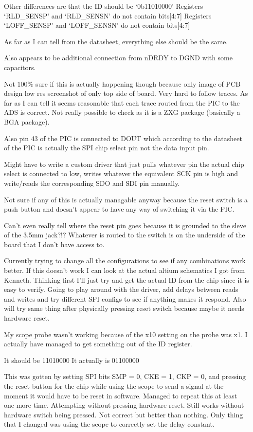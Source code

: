 Other differences are that the ID should be `0b11010000'
Registers `RLD\_SENSP' and `RLD\_SENSN' do not contain bits[4:7]
Registers `LOFF\_SENSP' and `LOFF\_SENSN' do not contain bits[4:7]

As far as I can tell from the datasheet, everything else should be the same.

Also appears to be additional connection from nDRDY to DGND with some capacitors.

Not 100\% sure if this is actually happening though because only image of PCB design
low res screenshot of only top side of board. Very hard to follow traces.
As far as I can tell it seems reasonable that each trace routed from the PIC to the ADS
is correct. Not really possible to check as it is a ZXG package (basically a BGA package).

Also pin 43 of the PIC is connected to DOUT which according to the datasheet of the PIC
is actually the SPI chip select pin not the data input pin.

Might have to write a custom driver that just pulls whatever pin the actual chip select
is connected to low, writes whatever the equivalent SCK pin is high and write/reads
the corresponding SDO and SDI pin manually.

Not sure if any of this is actually managable anyway because the reset switch
is a push button and doesn't appear to have any way of switching it via the PIC.

Can't even really tell where the reset pin goes because it is grounded to the sleve of
the 3.5mm jack?!? Whatever is routed to the switch is on the underside of the board
that I don't have access to.

Currently trying to change all the configurations to see if any combinations work better.
If this doesn't work I can look at the actual altium schematics I got from Kenneth.
Thinking first I'll just try and get the actual ID from the chip
since it is easy to verify.
Going to play around with the driver, add delays between reads and writes and try different
SPI configs to see if anything makes it respond.
Also will try same thing after physically pressing reset switch because maybe it needs
hardware reset.

My scope probe wasn't working because of the x10 setting on the probe was x1.
I actually have managed to get something out of the ID register.

It should be    11010000
It actually is  01100000

This was gotten by setting SPI bits SMP = 0, CKE = 1, CKP = 0, and pressing
the reset button for the chip while using the scope to send a signal at the moment it
would have to be reset in software.
Managed to repeat this at least one more time. Attempting without pressing hardware reset.
Still works without hardware switch being pressed. Not correct but better than nothing.
Only thing that I changed was using the scope to correctly set the delay constant.

